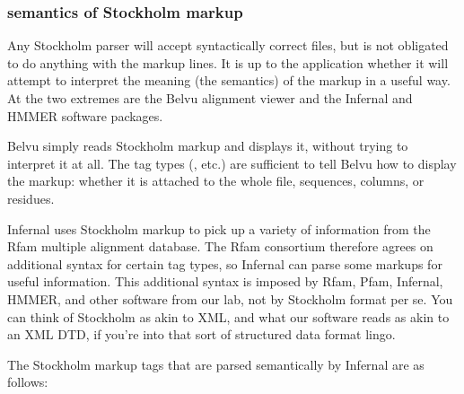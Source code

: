 \subsubsection{semantics of Stockholm markup}

Any Stockholm parser will accept syntactically correct files, but is
not obligated to do anything with the markup lines. It is up to the
application whether it will attempt to interpret the meaning (the
semantics) of the markup in a useful way. At the two extremes are the
Belvu alignment viewer and the Infernal and HMMER 
software packages.

Belvu simply reads Stockholm markup and displays it, without trying to
interpret it at all. The tag types (, etc.) are sufficient
to tell Belvu how to display the markup: whether it is attached to the
whole file, sequences, columns, or residues.

Infernal uses Stockholm markup to pick up a variety of information
from the Rfam multiple alignment database. The Rfam consortium
therefore agrees on additional syntax for certain tag types, so
Infernal can parse some markups for useful information. This
additional syntax is imposed by Rfam, Pfam, Infernal, HMMER, and other
software from our lab, not by Stockholm format per se. You can think
of Stockholm as akin to XML, and what our software reads as akin
to an XML DTD, if you're into that sort of structured data format
lingo.

The Stockholm markup tags that are parsed semantically by Infernal
are as follows:

